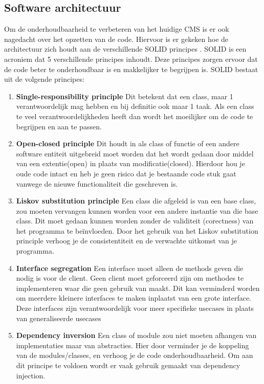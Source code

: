 \subsection{Software architectuur}
Om de onderhoudbaarheid te verbeteren van het huidige CMS is er ook nagedacht over het opzetten van de code.
Hiervoor is er gekeken hoe de architectuur zich houdt aan de verschillende SOLID principes \parencite{SOLID}. 
SOLID is een acroniem dat 5 verschillende principes inhoudt.
Deze principes zorgen ervoor dat de code beter te onderhoudbaar is en makkelijker te begrijpen is.
SOLID bestaat uit de volgende principes:

\begin{enumerate}
    \item \textbf{Single-responsibility principle}
    Dit betekent dat een class, maar 1 verantwoordelijk mag hebben en bij definitie ook maar 1 taak.
    Als een class te veel verantwoordelijkheden heeft dan wordt het moeilijker om de code te begrijpen en aan te passen.

    \item \textbf{Open-closed principle}
    Dit houdt in als class of functie of een andere software entiteit uitgebreid moet worden dat het wordt gedaan door middel van een extentie(open) in plaats van modificatie(closed).
    Hierdoor hou je oude code intact en heb je geen risico dat je bestaande code stuk gaat vanwege de nieuwe functionaliteit die geschreven is. 
        
    \item \textbf{Liskov substitution principle} 
    Een class die afgeleid is van een base class, zou moeten vervangen kunnen worden voor  een andere instantie van die base class.
    Dit moet gedaan kunnen worden zonder de validiteit (corectness) van het programma te beïnvloeden.
    Door het gebruik van het Liskov substitution principle verhoog je de consistentiteit en de verwachte uitkomst van je programma.

    \item \textbf{Interface segregation} 
    Een interface moet alleen de methods geven die nodig is voor de client. 
    Geen client moet geforceerd zijn om methodes te implementeren waar die geen gebruik van maakt.
    Dit kan verminderd worden om meerdere kleinere interfaces te maken inplaatst van een grote interface.
    Deze interfaces zijn verantwoordelijk voor meer specifieke usecases in plaats van generaliseerde usecases

    \item \textbf{Dependency inversion} 
    Een class of module zou niet moeten afhangen van implementaties maar van abstracties.
    Hier door verminder je de koppeling van de modules/classes, en verhoog je de code onderhoudbaarheid.
    Om aan dit principe te voldoen wordt er vaak gebruik gemaakt van dependency injection.
\end{enumerate}


